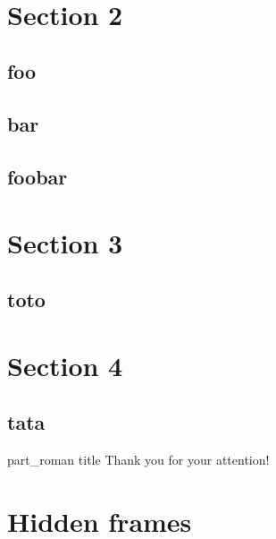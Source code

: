 \documentclass[aspectratio=169]{beamer}
\begin{document}
\begin{frame}{~}
{\begin{minipage}{0.45\textwidth}
	\end{minipage}}
\end{frame}

\section{Section 2}
\subsection{foo}
\frame{\frametitle{~}}\frame{\frametitle{~}}\frame{\frametitle{~}}\frame{\frametitle{~}}
\subsection{bar}
\frame{\frametitle{~}}\frame{\frametitle{~}}\frame{\frametitle{~}}\frame{\frametitle{~}}\frame{\frametitle{~}}\frame{\frametitle{~}}\frame{\frametitle{~}}\frame{\frametitle{~}}
\subsection{foobar}
\frame{\frametitle{~}}\frame{\frametitle{~}}\frame{\frametitle{~}}\frame{\frametitle{~}}
\frame{\frametitle{~}}\frame{\frametitle{~}}\frame{\frametitle{~}}\frame{\frametitle{~}}\frame{\frametitle{~}}

\section{Section 3}
\subsection*{toto}
\frame{\frametitle{~}}\frame{\frametitle{~}}\frame{\frametitle{~}}\frame{\frametitle{~}}\frame{\frametitle{~}}
\section{Section 4}
\subsection{tata}
\frame{\frametitle{~}}\frame{\frametitle{~}}\frame{\frametitle{~}}\frame{\frametitle{~}}\frame{\frametitle{~}}



\biblio
\begin{frame}{}
    \begin{centering}
        \begin{beamercolorbox}[sep=12pt,center]{part_roman title}
            \Large Thank you for your attention!
        \end{beamercolorbox}
    \end{centering}
\end{frame}



\section*{Hidden frames}


\end{document}
